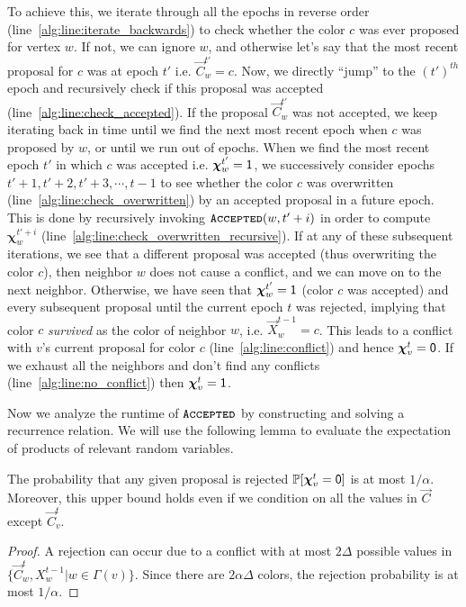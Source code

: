 To achieve this, we iterate through all the epochs in reverse order (line~\ref{alg:line:iterate_backwards})
to check whether the color $c$ was ever proposed for vertex $w$.
If not, we can ignore $w$, and otherwise let's say that the most recent proposal for $c$ was at epoch $t'$ i.e. $\vec C^{t'}_w = c$.
Now, we directly ``jump'' to the $(t')^{th}$ epoch and recursively check if this proposal was accepted (line~\ref{alg:line:check_accepted}).
If the proposal $\vec C^{t'}_w$ was not accepted, we keep iterating back in time until we find the next most recent epoch
when $c$ was proposed by $w$, or until we run out of epochs.
When we find the most recent epoch $t'$ in which $c$ was accepted i.e. $\bm\chi^{t'}_w = \mathsf{1}$,
we successively consider epochs $t'+1, t'+2, t'+3, \cdots, t-1$ to see whether the color $c$ was overwritten
(line~\ref{alg:line:check_overwritten}) by an accepted proposal in a future epoch.
This is done by recursively invoking $\texttt{\textsc{Accepted}}(w,t'+i)$ in order to compute $\bm\chi^{t'+i}_w$ (line~\ref{alg:line:check_overwritten_recursive}).
If at any of these subsequent iterations, we see that a different proposal was accepted (thus overwriting the color $c$),
then neighbor $w$ does not cause a conflict, and we can move on to the next neighbor.
Otherwise, we have seen that $\bm\chi^{t'}_w = \mathsf{1}$ (color $c$ was accepted) and every subsequent proposal until the current epoch $t$ was rejected,
implying that color $c$ \emph{survived} as the color of neighbor $w$, i.e. $\vec X^{t-1}_w = c$.
This leads to a conflict with $v$'s current proposal for color $c$ (line~\ref{alg:line:conflict}) and hence $\bm\chi^t_v = \mathsf{0}$.
If we exhaust all the neighbors and don't find any conflicts (line~\ref{alg:line:no_conflict}) then $\bm\chi^t_v = \mathsf{1}$.


Now we analyze the runtime of $\texttt{\textsc{Accepted}}$ by constructing and solving a recurrence relation.
We will use the following lemma to evaluate the expectation of products of relevant random variables.

\begin{lemma}
\label{lem:color_reject_probability}
The probability that any given proposal is rejected $\mathbb P[\bm\chi^t_v=\mathsf{0}]$ is at most $1/\alpha$.
Moreover, this upper bound holds even if we condition on all the values in $\vec C$ except $\vec C^t_v$.
\end{lemma}
\begin{proof}
A rejection can occur due to a conflict with at most $2\Delta$ possible values in $\{\vec C^t_w, X^{t-1}_w | w\in\Gamma(v)\}$.
Since there are $2\alpha\Delta$ colors, the rejection probability is at most $1/\alpha$.
\end{proof}

